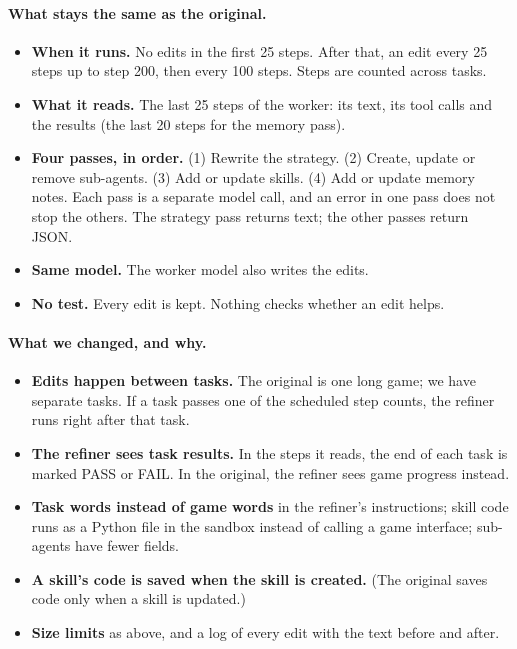 \paragraph{What stays the same as the original.}
\begin{itemize}
  \item \textbf{When it runs.} No edits in the first 25 steps. After that, an edit every 25 steps
        up to step 200, then every 100 steps. Steps are counted across tasks.
  \item \textbf{What it reads.} The last 25 steps of the worker: its text, its tool calls and the
        results (the last 20 steps for the memory pass).
  \item \textbf{Four passes, in order.} (1) Rewrite the strategy. (2) Create, update or remove
        sub-agents. (3) Add or update skills. (4) Add or update memory notes. Each pass is a
        separate model call, and an error in one pass does not stop the others. The strategy pass
        returns text; the other passes return JSON.
  \item \textbf{Same model.} The worker model also writes the edits.
  \item \textbf{No test.} Every edit is kept. Nothing checks whether an edit helps.
\end{itemize}

\paragraph{What we changed, and why.}
\begin{itemize}
  \item \textbf{Edits happen between tasks.} The original is one long game; we have separate tasks.
        If a task passes one of the scheduled step counts, the refiner runs right after that task.
  \item \textbf{The refiner sees task results.} In the steps it reads, the end of each task is
        marked PASS or FAIL. In the original, the refiner sees game progress instead.
  \item \textbf{Task words instead of game words} in the refiner's instructions; skill code runs as a
        Python file in the sandbox instead of calling a game interface; sub-agents have fewer fields.
  \item \textbf{A skill's code is saved when the skill is created.} (The original saves code only
        when a skill is updated.)
  \item \textbf{Size limits} as above, and a log of every edit with the text before and after.
\end{itemize}

